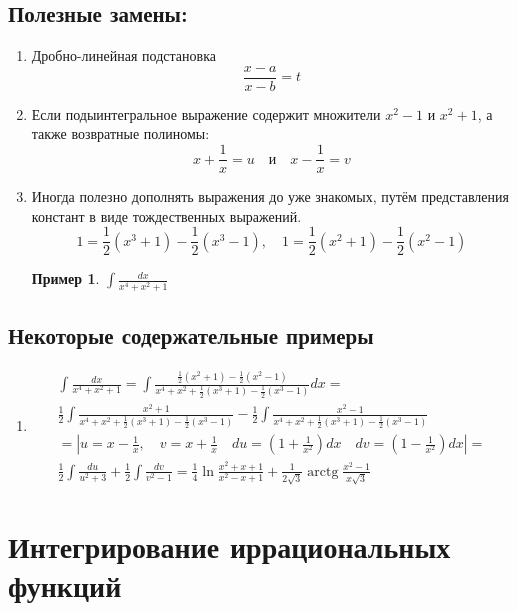 \documentclass[a4paper,12pt]{article}
\newtheorem{lemma}{Пример}
\begin{document}
	\subsection{Полезные замены:}
	\begin{enumerate}
		\item
		Дробно-линейная подстановка
		\[
		\frac{x-a}{x-b}=t
		\]
		\item
		Если подыинтегральное выражение содержит множители $x^{2}-1$ и $x^{2}+1$, а также возвратные полиномы:
		\[
		x+\frac{1}{x}=u \quad \text{и} \quad x-\frac{1}{x}=v
		\]
		
		\item
		Иногда полезно дополнять выражения до уже знакомых, путём представления констант в виде тождественных выражений.
		$$1=\frac{1}{2}\left(x^{3}+1\right)-\frac{1}{2}\left(x^{3}-1\right), \quad 1=\frac{1}{2}\left(x^{2}+1\right)-\frac{1}{2}\left(x^{2}-1\right)$$
		\begin{lemma}
			$\int \frac{d x}{x^{4}+x^{2}+1}$
		\end{lemma}	
		
	\end{enumerate}
	\subsection{Некоторые содержательные примеры}
	\begin{enumerate}
		\item
			$$
			\begin{aligned}
				\int \frac{d x}{x^{4}+x^{2}+1}=\int \frac{\frac{1}{2}\left(x^{2}+1\right)-\frac{1}{2}\left(x^{2}-1\right)}{x^{4}+x^{2} + \frac{1}{2}\left(x^{3}+1\right)-\frac{1}{2}\left(x^{3}-1\right)} d x =\\ \frac{1}{2} \int \frac{x^{2}+1}{x^4+x^2+\frac{1}{2}\left(x^3+1\right)-\frac{1}{2}\left(x^3-1\right)} -
				\frac{1}{2} \int \frac{x^{2}-1}{x^4+x^2+\frac{1}{2}\left(x^3+1\right)-\frac{1}{2}\left(x^3-1\right)} \\
				=\left|u=x-\frac{1}{x}, \quad v=x+\frac{1}{x} \quad  d u = \left(1+\frac{1}{x^2}\right) d x \quad d v = \left(1-\frac{1}{x^2}\right) d x\right| =\\
				\frac{1}{2} \int \frac{du}{u^2+3}+ \frac{1}{2} \int \frac{dv}{v^2-1}=\frac{1}{4} \ln \frac{x^{2}+x+1}{x^{2}-x+1}+\frac{1}{2 \sqrt{3}} \operatorname{arctg} \frac{x^{2}-1}{x \sqrt{3}}	
			\end{aligned}
			$$
	\end{enumerate}
	



	\section{Интегрирование иррациональных функций}

	
\end{document}
